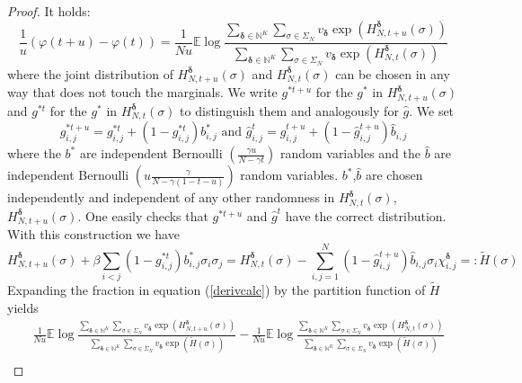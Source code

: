 \documentclass[a4paper,12pt,oneside,reqno]{amsart}
\numberwithin{equation}{section}
\begin{document}
\begin{proof}
It holds:
\begin{equation}\label{derivcalc}\frac{1}{u} \left(\varphi(t+u)-\varphi(t)\right) = \frac{1}{N u}{{\mathbb{E}}} \log \frac{\sum\limits_{{\boldsymbol{\delta}}\in{\mathbb{N}}^K}\sum\limits_{\sigma \in \Sigma_N} v_{\boldsymbol{\delta}} \exp\left(H^{\boldsymbol{\delta}}_{N,t+u}(\sigma)\right)}{\sum\limits_{{\boldsymbol{\delta}}\in{\mathbb{N}}^K}\sum\limits_{\sigma \in \Sigma_N} v_{\boldsymbol{\delta}} \exp\left(H^{\boldsymbol{\delta}}_{N,t}(\sigma)\right)} \end{equation}
where the joint distribution of $H^{\boldsymbol{\delta}}_{N,t+u}(\sigma)$ and $H^{\boldsymbol{\delta}}_{N,t}(\sigma)$ can be chosen in any way that does not touch the marginals.
We write $g^{*t+u}$ for the $g^*$ in $H^{\boldsymbol{\delta}}_{N,t+u}(\sigma)$ and $g^{*t}$ for the $g^*$ in $H^{\boldsymbol{\delta}}_{N,t}(\sigma)$ to distinguish them and analogously for $\hat{g}$.
We set 
$$ g^{*t+u}_{i,j}= g^{*t}_{i,j}+ \left(1-g^{*t}_{i,j}\right)b^*_{i,j} \mbox{ and } \hat{g}^{t}_{i,j}= \hat{g}^{t+u}_{i,j}+\left(1-\hat{g}^{t+u}_{i,j}\right)\hat{b}_{i,j}$$
where the $b^*$ are independent Bernoulli $(\frac{\gamma u}{N-\gamma t})$ random variables and the $\hat{b}$ are independent Bernoulli $(u \frac{\gamma}{N-\gamma\left(1-t-u\right)})$ random variables. $b^*$,$\hat{b}$ are chosen independently and independent of any other randomness in $H^{\boldsymbol{\delta}}_{N,t}(\sigma)$,$H^{\boldsymbol{\delta}}_{N,t+u}(\sigma)$. One easily checks that $g^{*t+u}$ and $\hat{g}^{t}$ have the correct distribution. With this construction we have 
$$ H^{\boldsymbol{\delta}}_{N,t+u}(\sigma)+ \beta \sum\limits_{i<j} \left(1-g^{*t}_{i,j}\right)b^*_{i,j} \sigma_i \sigma_j  = H^{\boldsymbol{\delta}}_{N,t}(\sigma) - \sum\limits_{i,j=1}^N \left(1-\hat{g}^{t+u}_{i,j}\right)\hat{b}_{i,j}\sigma_i \chi^{\boldsymbol{\delta}}_{i,j}=: \tilde{H}(\sigma)$$
Expanding the fraction in equation (\ref{derivcalc}) by the partition function of $\tilde{H}$ yields
\[ \begin{aligned}
& \frac{1}{N u}{{\mathbb{E}}} \log \frac{\sum\limits_{{\boldsymbol{\delta}}\in{\mathbb{N}}^K}\sum\limits_{\sigma \in \Sigma_N} v_{\boldsymbol{\delta}} \exp\left(H^{\boldsymbol{\delta}}_{N,t+u}(\sigma)\right)}{\sum\limits_{{\boldsymbol{\delta}}\in{\mathbb{N}}^K}\sum\limits_{\sigma \in \Sigma_N} v_{\boldsymbol{\delta}} \exp\left(\tilde{H}(\sigma)\right)}-\frac{1}{N u}{{\mathbb{E}}} \log \frac{\sum\limits_{{\boldsymbol{\delta}}\in{\mathbb{N}}^K}\sum\limits_{\sigma \in \Sigma_N} v_{\boldsymbol{\delta}} \exp\left(H^{\boldsymbol{\delta}}_{N,t}(\sigma)\right)}{\sum\limits_{{\boldsymbol{\delta}}\in{\mathbb{N}}^K}\sum\limits_{\sigma \in \Sigma_N} v_{\boldsymbol{\delta}} \exp\left(\tilde{H}(\sigma)\right)} \\

\end{aligned}\]
\end{proof}
\end{document}
